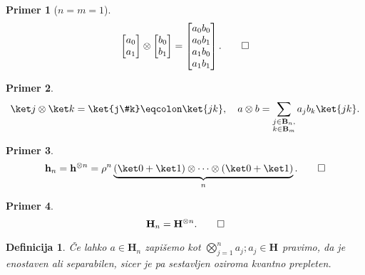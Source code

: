 \documentclass[a4paper]{article}
\newtheorem{definition}{Definicija}
\newtheorem*{example}{Primer}
\newcommand{\hh}[1][]{\mathbf{h}_{#1}}
\newcommand{\B}[1][]{\mathbf{B}_{#1}}
\renewcommand{\H}[1][]{\mathbf{H}_{#1}}
\begin{document}
\begin{example}[\(n=m=1\)]
    \[
        \begin{bmatrix}a_0 \\ a_1\end{bmatrix}\otimes \begin{bmatrix}b_0 \\ b_1\end{bmatrix}
        = \begin{bmatrix}a_0b_0\\ a_0b_1\\ a_1b_0\\ a_1b_1\end{bmatrix}\text.\qedhere
    \]
\end{example}

\begin{example}
    \[
        \ket j \otimes \ket k = \ket{j\#k} \eqcolon \ket{jk},\quad
        a\otimes b = \sum_{\substack{j\in\B[n],\\k\in\B[m]}} a_jb_k\ket{jk}.
    \]
\end{example}

\begin{example}
    \[
        \hh[n] = \hh^{\otimes n} = \rho^n\underbrace{(\ket 0 + \ket 1)\otimes\dots\otimes(\ket 0 + \ket 1)}_n\text.\qedhere
    \]
\end{example}
\begin{example}
    \[\H[n] = \H^{\otimes n}\text.\qedhere\]
\end{example}

\begin{definition}
    Če lahko \(a\in\H[n]\) zapišemo kot \(\bigotimes_{j=1}^{n} a_j; a_j\in\H\) pravimo, da je enostaven ali separabilen, sicer je pa sestavljen oziroma kvantno prepleten.
\end{definition}
\end{document}
